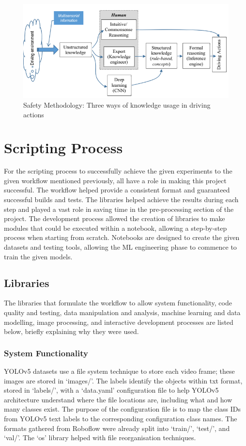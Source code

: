 \documentclass[12pt]{report} %
\begin{document}
		\begin{figure}[hb]
			\centering
			\includegraphics[width=.60\columnwidth]{Figures/literature_review/proposal/SystemFunctionality-2.png}
			\caption{Safety Methodology: Three ways of knowledge usage in driving actions~\cite{ionita_autonomous_2017}}
			\label{fig:avmOperationalMethodology-SF2}
		\end{figure}


\chapter{Scripting Process}
\label{chap:scriptingProcess}
	For the scripting process to successfully achieve the given experiments to the given workflow mentioned previously, all have a role in making this project successful. The workflow helped provide a consistent format and guaranteed successful builds and tests. The libraries helped achieve the results during each step and played a vast role in saving time in the pre-processing section of the project. The development process allowed the creation of libraries to make modules that could be executed within a notebook, allowing a step-by-step process when starting from scratch. Notebooks are designed to create the given datasets and testing tools, allowing the ML engineering phase to commence to train the given models.

	\section{Libraries}
		The libraries that formulate the workflow to allow system functionality, code quality and testing, data manipulation and analysis, machine learning and data modelling, image processing, and interactive development processes are listed below, briefly explaining why they were used.

		\subsection*{System Functionality}
			YOLOv5 datasets use a file system technique to store each video frame; these images are stored in `images/'. The labels identify the objects within txt format, stored in `labels/', with a `data.yaml' configuration file to help YOLOv5 architecture understand where the file locations are, including what and how many classes exist. The purpose of the configuration file is to map the class IDs from YOLOv5 text labels to the corresponding configuration class names. The formats gathered from Roboflow were already split into `train/', `test/', and `val/'. The `os' library helped with file reorganisation techniques.
\end{document}
